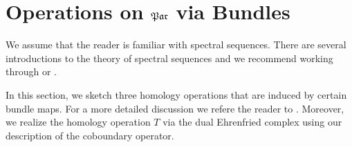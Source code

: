 \section{Operations on \texorpdfstring{$\mathfrak{Par}$}{Par} via Bundles}
\label{homology_operations:operations_par_via_bundles}
We assume that the reader is familiar with spectral sequences.
There are several introductions to the theory of spectral sequences and we recommend working through \cite[Chapter 5]{Weibel1995} or \cite[Chapter 9]{Spanier199412}.

In this section, we sketch three homology operations that are induced by certain bundle maps.
For a more detailed discussion we refere the reader to \cite[Chapter 4]{Mehner201112}.
Moreover, we realize the homology operation $T$ via the dual Ehrenfried complex using our description of the coboundary operator.

